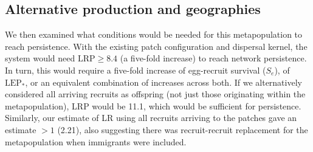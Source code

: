 \documentclass[12pt, oneside]{article}   	%
\begin{document}


\subsection*{Alternative production and geographies}

We then examined what conditions would be needed for this metapopulation to reach persistence. With the existing patch configuration and dispersal kernel, the system would need $\text{LRP} \geq 8.4$ (a five-fold increase) to reach network persistence. In turn, this would require a five-fold increase of egg-recruit survival ($S_e$), of $\text{LEP}_*$, or an equivalent combination of increases across both. If we alternatively considered all arriving recruits as offspring (not just those originating within the metapopulation), LRP would be 11.1, which would be sufficient for persistence. Similarly, our estimate of LR using all recruits arriving to the patches gave an estimate $> 1$ (2.21), also suggesting there was recruit-recruit replacement for the metapopulation when immigrants were included. 
\end{document}
